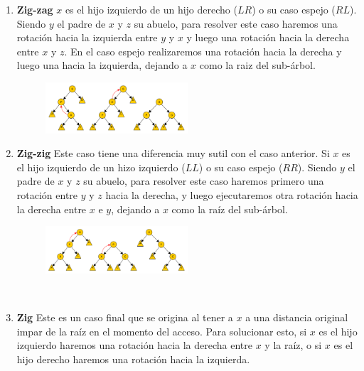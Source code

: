 \begin{enumerate}
 \item \textbf{Zig-zag} $x$ es el hijo izquierdo de un hijo derecho ($LR$) o su caso espejo ($RL$). Siendo $y$ el padre de $x$ y $z$ su abuelo, para resolver este caso haremos una rotaci\'on hacia la izquierda entre $y$ y $x$ y luego una rotaci\'on hacia la derecha entre $x$ y $z$. En el caso espejo realizaremos una rotaci\'on hacia la derecha y luego una hacia la izquierda, dejando a $x$ como la raiz del sub-\'arbol.
 
 \begin{figure}
 \centering
 \includegraphics[width=0.5\textwidth]{graficos/ZigZagSplay.pdf}
 \end{figure}
 
 \item \textbf{Zig-zig} Este caso tiene una diferencia muy sutil con el caso anterior. Si $x$ es el hijo izquierdo de un hizo izquierdo ($LL$) o su caso espejo ($RR$). Siendo $y$ el padre de $x$ y $z$ su abuelo, para resolver este caso haremos primero una rotaci\'on entre $y$ y $z$ hacia la derecha, y luego ejecutaremos otra rotaci\'on hacia la derecha entre $x$ e $y$, dejando a $x$ como la ra\'iz del sub-\'arbol.
 
 \begin{figure}
 \centering
 \includegraphics[width=0.5\textwidth]{graficos/ZigZigSplay.pdf}
 \end{figure}
 
 ~
 
 \item \textbf{Zig} Este es un caso final que se origina al tener a $x$ a una distancia original impar de la ra\'iz en el momento del acceso. Para solucionar esto, si $x$ es el hijo izquierdo haremos una rotaci\'on hacia la derecha entre $x$ y la ra\'iz, o si $x$ es el hijo derecho haremos una rotaci\'on hacia la izquierda.
\end{enumerate}

